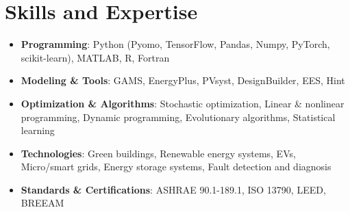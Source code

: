 \documentclass[letter,20pt]{article}
\begin{document}
\section{\textbf{Skills and Expertise}}	    
\vspace{5pt}
    \begin{itemize}[noitemsep, topsep=6pt, after=\vspace{-5 mm}, leftmargin = 3ex]
        \item \small \textbf{Programming}: Python (Pyomo, TensorFlow, Pandas, Numpy, PyTorch, scikit-learn), MATLAB, R, Fortran \vspace {5pt}
        \item \small \textbf{Modeling \& Tools}: GAMS, EnergyPlus, PVsyst, DesignBuilder, EES, Hint \vspace {5pt}
         \item \small \textbf{Optimization \& Algorithms}: Stochastic optimization, Linear \& nonlinear programming, Dynamic programming, Evolutionary algorithms, Statistical learning \vspace{5pt}
	    \item \small \textbf{Technologies}: Green buildings, Renewable energy systems, EVs, Micro/smart grids, Energy storage systems, Fault detection and diagnosis \vspace{5pt}
        \item \small \textbf{Standards \& Certifications}: ASHRAE 90.1-189.1, ISO 13790, LEED, BREEAM  \vspace{5pt}
\end{itemize}
\vspace{0pt}
\end{document}
